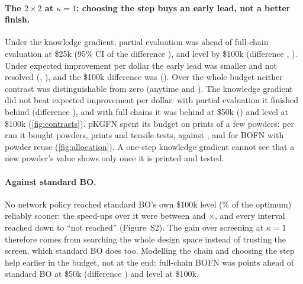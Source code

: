 \documentclass[11pt]{article}
\begin{document}
\paragraph{The $2\times2$ at $\kappa=1$: choosing the step buys an early lead,
not a better finish.} Under the knowledge gradient, partial evaluation was
\pp{} ahead of full-chain evaluation at \$25k (95\% CI of
the difference ), and level by \$100k (difference
\pp, ). Under expected improvement per
dollar the early lead was smaller and not resolved (\pp,
), and the \$100k difference was \pp{}
(). Over the whole budget neither contrast was
distinguishable from zero (anytime \pp{} and
\pp). The knowledge gradient did not beat expected improvement
per dollar: with partial evaluation it finished \pp{} behind
(difference ), and with full chains it was
\pp{} behind at \$50k () and level at
\$100k (\cref{fig:contrasts}).
pKGFN spent its budget on prints of a few powders: per run it bought
 powders,  prints and 
tensile tests, against ,  and
 for BOFN with powder reuse (\cref{fig:allocation}).
A one-step knowledge gradient cannot see that a new powder's value shows only
once it is printed and tested.

\paragraph{Against standard BO.} No network policy reached standard BO's own
\$100k level (\% of the optimum) reliably sooner: the
speed-ups over it were between  and
$\times$, and every interval reached down to ``not reached''
(Figure~S2). The gain over screening at $\kappa=1$ therefore comes from
searching the whole design space instead of trusting the screen, which standard
BO does too. Modelling the chain and choosing the step help earlier in the budget,
not at the end: full-chain BOFN was  points ahead of
standard BO at \$50k (difference ) and level at \$100k.
\end{document}
